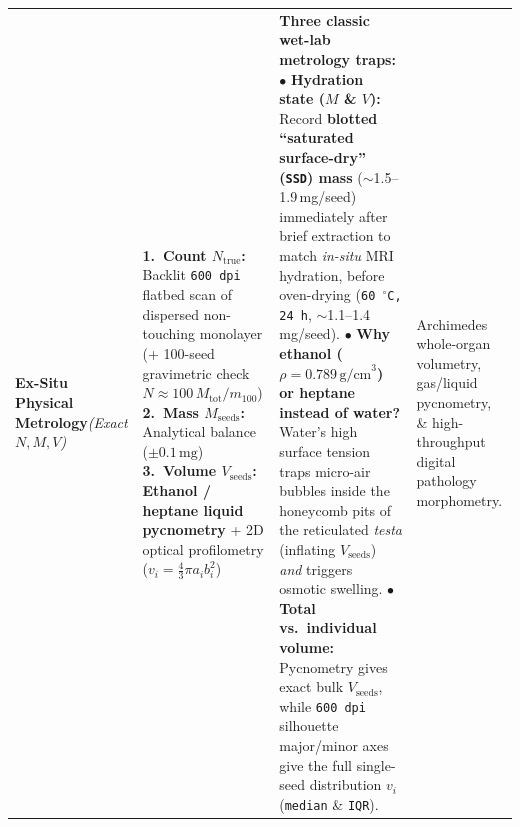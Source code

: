 \documentclass[10pt,a4paper]{article}
\begin{document}
{\begin{xltabular}{\textwidth}{L{2.55cm} L{4.25cm} Y L{3.35cm}}
\textbf{Ex-Situ Physical Metrology}\newline \textit{(Exact $N, M, V$)} &
\textbf{1.\ Count $N_{\text{true}}$:} Backlit \texttt{600\,dpi} flatbed scan of dispersed non-touching monolayer (+ 100-seed gravimetric check $N \approx 100\,M_{\text{tot}}/m_{100}$)\newline
\textbf{2.\ Mass $M_{\text{seeds}}$:} Analytical balance ($\pm 0.1\,\text{mg}$)\newline
\textbf{3.\ Volume $V_{\text{seeds}}$:} \textbf{Ethanol / heptane liquid pycnometry} + 2D optical profilometry ($v_i = \frac{4}{3}\pi a_i b_i^2$) &
\textbf{Three classic wet-lab metrology traps:}\newline
$\bullet$ \textbf{Hydration state ($M$ \& $V$):} Record \textbf{blotted ``saturated surface-dry'' (\texttt{SSD}) mass} ($\sim$1.5--1.9\,mg/seed) immediately after brief extraction to match \textit{in-situ} MRI hydration, before oven-drying (\texttt{60\,$^\circ$C, 24\,h}, $\sim$1.1--1.4\,mg/seed).\newline
$\bullet$ \textbf{Why ethanol ($\rho = 0.789\,\text{g/cm}^3$) or heptane instead of water?} Water's high surface tension traps micro-air bubbles inside the honeycomb pits of the reticulated \textit{testa} (inflating $V_{\text{seeds}}$) \textit{and} triggers osmotic swelling.\newline
$\bullet$ \textbf{Total vs.\ individual volume:} Pycnometry gives exact bulk $V_{\text{seeds}}$, while \texttt{600\,dpi} silhouette major/minor axes give the full single-seed distribution $v_i$ (\texttt{median} \& \texttt{IQR}). &
Archimedes whole-organ volumetry, gas/liquid pycnometry, \& high-throughput digital pathology morphometry. \\
\end{xltabular}
}
\end{document}

